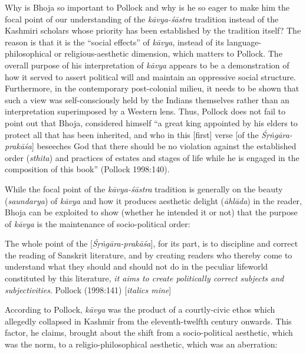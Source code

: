 Why is Bhoja so important to Pollock and why is he so eager to make him the focal point of our understanding of the \textsl{kāvya-śāstra} tradition instead of the Kashmiri scholars whose priority has been established by the tradition itself? The reason is that it is the ``social effects'' of \textsl{kāvya}, instead of its language-philosophical or religious-aesthetic dimension, which matters to Pollock. The overall purpose of his interpretation of \textsl{kāvya} appears to be a demonstration of how it served to assert political will and maintain an oppressive social structure. Furthermore, in the contemporary post-colonial milieu, it needs to be shown that such a view was self-consciously held by the Indians themselves rather than an interpretation superimposed by a Western lens. Thus, Pollock does not fail to point out that Bhoja, considered himself ``a great king appointed by his elders to protect all that has been inherited, and who in this [first] verse [of the \textsl{Śṛṅgāra-prakāśa}] beseeches God that there should be no violation against the established order (\textsl{sthita}) and practices of estates and stages of life while he is engaged in the composition of this book'' (Pollock 1998:140).

While the focal point of the \textsl{kāvya-śāstra} tradition is generally on the beauty (\textsl{saundarya}) of \textsl{kāvya} and how it produces aesthetic delight (\textsl{āhlāda}) in the reader, Bhoja can be exploited to show (whether he intended it or not) that the purpose of \textsl{kāvya} is the maintenance of socio-political order:

\begin{myquote}
The whole point of the [\textsl{Śṛṅgāra-prakāśa}], for its part, is to discipline and correct the reading of Sanskrit literature, and by creating readers who thereby come to understand what they should and should not do in the peculiar lifeworld constituted by this literature, \textsl{it aims to create politically correct subjects and subjectivities}. 
\hfill Pollock (1998:141) [\textsl{italics mine}]
\end{myquote}

According to Pollock, \textsl{kāvya} was the product of a courtly-civic ethos which allegedly collapsed in Kashmir from the eleventh-twelfth century onwards. This factor, he claims, brought about the shift from a socio-political aesthetic, which was the norm, to a religio-philosophical aesthetic, which was an aberration:

